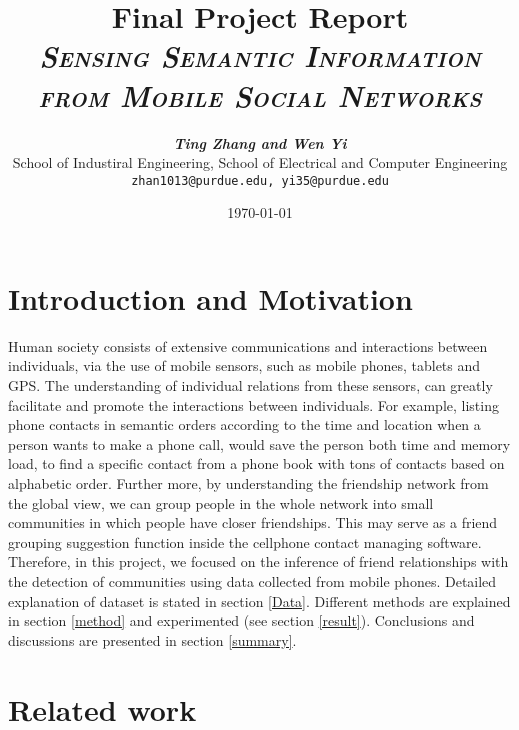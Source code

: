 \documentclass[11pt]{article}
\title{
\textbf{Final Project Report} \\ \textsc{\textit{Sensing Semantic Information from Mobile Social Networks}} \\
}
\author{
	\textbf{\textit{Ting Zhang and Wen Yi}} \\
	School of Industiral Engineering, School of Electrical and Computer Engineering\\
	\texttt{zhan1013@purdue.edu, yi35@purdue.edu}
}
\date{\today}
\begin{document}
\maketitle


\section{Introduction and Motivation}
Human society consists of extensive communications and interactions between individuals, via the use of mobile sensors, such as mobile phones, tablets and GPS. The understanding of individual relations from these sensors, can greatly facilitate and promote the interactions between individuals. 
For example, listing phone contacts in semantic orders according to the time and location when a person wants to make a phone call, would save the person both time and memory load, to find a specific contact from a phone book with tons of contacts based on alphabetic order. 
Further more, by understanding the friendship network from the global view, we can group people in the whole network into small communities in which people have closer friendships. This may serve as a friend grouping suggestion function inside the cellphone contact managing software.
Therefore, in this project, we focused on the inference of friend relationships with the detection of communities using data collected from mobile phones. Detailed explanation of dataset is stated in section \ref{Data}. Different methods are explained in section \ref{method} and experimented (see section \ref{result}). Conclusions and discussions are presented in section \ref{summary}.

\section{Related work}
\end{document}
